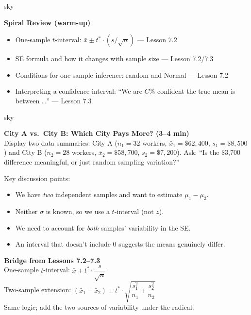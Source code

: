 \documentclass[10pt]{article}
\begin{document}
\begin{skillbox}{sky}
\begin{minipage}[t]{0.55\linewidth}\vspace{0pt}
    \textbf{Spiral Review (warm-up)}
    \begin{itemize}
        \item One-sample $t$-interval: $\bar x \pm t^* \cdot (s/\sqrt{n})$ --- Lesson 7.2
        \item SE formula and how it changes with sample size --- Lesson 7.2/7.3
        \item Conditions for one-sample inference: random and Normal --- Lesson 7.2
        \item Interpreting a confidence interval: ``We are $C\%$ confident the true
              mean is between \ldots'' --- Lesson 7.3
    \end{itemize}
\end{minipage}
\hfill
\begin{minipage}[t]{0.38\linewidth}\vspace{0pt}\centering
\end{minipage}
\end{skillbox}

\begin{skillbox}[Hook]{sky}
\begin{minipage}[t]{0.55\linewidth}
    \textbf{City A vs.\ City B: Which City Pays More? (3--4 min)}\\
    Display two data summaries: City A ($n_1 = 32$ workers, $\bar x_1 = \$62{,}400$,
    $s_1 = \$8{,}500$) and City B ($n_2 = 28$ workers, $\bar x_2 = \$58{,}700$,
    $s_2 = \$7{,}200$). Ask: ``Is the \$3,700 difference meaningful, or just random
    sampling variation?''

    Key discussion points:
    \begin{itemize}
        \item We have \emph{two} independent samples and want to estimate $\mu_1 - \mu_2$.
        \item Neither $\sigma$ is known, so we use a $t$-interval (not $z$).
        \item We need to account for \emph{both} samples' variability in the SE.
        \item An interval that doesn't include 0 suggests the means genuinely differ.
    \end{itemize}
\end{minipage}
\hfill
\begin{minipage}[t]{0.40\linewidth}
    \textbf{Bridge from Lessons 7.2--7.3}\\
    One-sample $t$-interval: $\bar x \pm t^* \cdot \dfrac{s}{\sqrt{n}}$\\[6pt]
    Two-sample extension:
    $(\bar x_1 - \bar x_2) \pm t^* \cdot \sqrt{\dfrac{s_1^2}{n_1} + \dfrac{s_2^2}{n_2}}$\\[6pt]
    Same logic; add the two sources of variability under the radical.
\end{minipage}
\end{skillbox}
\end{document}

